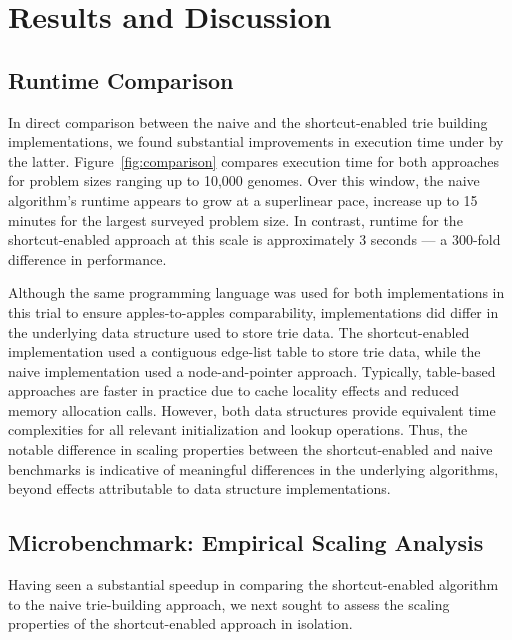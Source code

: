 \section{Results and Discussion} \label{sec:results}

\subsection{Runtime Comparison}

In direct comparison between the naive and the shortcut-enabled trie building implementations, we found substantial improvements in execution time under by the latter.
Figure~\ref{fig:comparison} compares execution time for both approaches for problem sizes ranging up to 10,000 genomes.
Over this window, the naive algorithm's runtime appears to grow at a superlinear pace, increase up to 15 minutes for the largest surveyed problem size.
In contrast, runtime for the shortcut-enabled approach at this scale is approximately 3 seconds --- a 300-fold difference in performance.



Although the same programming language was used for both implementations in this trial to ensure apples-to-apples comparability, implementations did differ in the underlying data structure used to store trie data.
The shortcut-enabled implementation used a contiguous edge-list table to store trie data, while the naive implementation used a node-and-pointer approach.
Typically, table-based approaches are faster in practice due to cache locality effects and reduced memory allocation calls.
However, both data structures provide equivalent time complexities for all relevant initialization and lookup operations.
Thus, the notable difference in scaling properties between the shortcut-enabled and naive benchmarks is indicative of meaningful differences in the underlying algorithms, beyond effects attributable to data structure implementations.

\subsection{Microbenchmark: Empirical Scaling Analysis}



Having seen a substantial speedup in comparing the shortcut-enabled algorithm to the naive trie-building approach, we next sought to assess the scaling properties of the shortcut-enabled approach in isolation.

